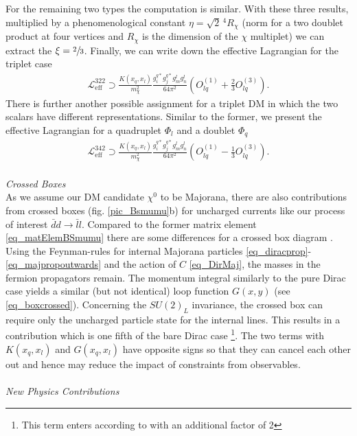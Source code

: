 For the remaining two types the computation is similar. With these three results, multiplied by a 
phenomenological constant $\eta=\sqrt{2}\,^4 R_\chi$ (norm for a two doublet product at four vertices and $R_\chi$ is the dimension of the $\chi$ multiplet) 
we can extract the $\xi=\sfrac23$. Finally, we can write down the effective Lagrangian for the triplet case
\begin{align}
 \mathcal{L}^{{322}}_\text{eff} \supset \frac{K(x_q,x_l)}{m_\chi^2}\frac{g_i^{q*} g_j^{q*} g_m^l g_n^l}{64\pi^2}\left(O_{lq}^{(1)} + \frac23 O_{lq}^{(3)}\right).
 \label{eq_LagBSmumuModB}
\end{align}
There is further another possible assignment for a triplet DM in which the two scalars have different representations. Similar to the former, we
present the effective Lagrangian for a quadruplet $\Phi_l$ and a doublet $\Phi_q$
\begin{align}
 \mathcal{L}^{{342}}_\text{eff} \supset \frac{K(x_q,x_l)}{m_\chi^2}\frac{g_i^{q*} g_j^{q*} g_m^l g_n^l}{64\pi^2}\left(O_{lq}^{(1)} - \frac13 O_{lq}^{(3)}\right).
 \label{eq_LagBSmumuModC}
\end{align}
\\ \textit{Crossed Boxes}\\
\noindent As we assume our DM candidate $\chi^0$ to be Majorana, there are also contributions from crossed boxes (fig. \ref{pic_Bsmumu}b) for uncharged
currents like our process of interest $\bar d d\rightarrow \bar l l$. Compared to the former matrix element \eqref{eq_matElemBSmumu} there are
some differences for a crossed box diagram \cite{1411.6743}. Using the Feynman-rules for internal Majorana particles 
\eqref{eq_diracprop}-\eqref{eq_majpropoutwards} and the action of $C$ \eqref{eq_DirMaj}, 
the masses in the fermion propagators remain. The momentum integral similarly to the pure Dirac case yields
a similar (but not identical) loop function $G(x,y)$ (see \eqref{eq_boxcrossed}).
Concerning the $SU(2)_L$ invariance, the crossed box can require only the uncharged particle state for the internal lines. 
This results in a contribution which is one fifth of the bare Dirac case \footnote[2]{This term enters according to \cite{1608.07832} with an additional 
factor of 2}. The two terms with $K(x_q,x_l)$ and $G(x_q,x_l)$ have opposite signs so 
that they can cancel each other out and hence may reduce the impact of constraints from observables.\\
\\ \textit{New Physics Contributions}\\
